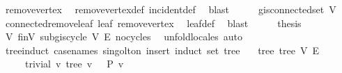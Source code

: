 \begin{isabellebody}
\ remove{\isacharunderscore}{\kern0pt}vertex\ \isamarkupfalse%
\ remove{\isacharunderscore}{\kern0pt}vertex{\isacharunderscore}{\kern0pt}def\ incident{\isacharunderscore}{\kern0pt}def\ \isamarkupfalse%
\ blast\isanewline
\ \ \isamarkupfalse%
\ \isamarkupfalse%
\ {\isachardoublequoteopen}g{\isacharprime}{\kern0pt}{\isachardot}{\kern0pt}is{\isacharunderscore}{\kern0pt}connected{\isacharunderscore}{\kern0pt}set\ V{\isacharprime}{\kern0pt}{\isachardoublequoteclose}\ \isamarkupfalse%
\ connected{\isacharunderscore}{\kern0pt}remove{\isacharunderscore}{\kern0pt}leaf\ leaf\ remove{\isacharunderscore}{\kern0pt}vertex\ \isamarkupfalse%
\ leaf{\isacharunderscore}{\kern0pt}def\ \isamarkupfalse%
\ blast\isanewline
\ \ \isamarkupfalse%
\ \isamarkupfalse%
\ {\isacharquery}{\kern0pt}thesis\ \isamarkupfalse%
\ {\isacartoucheopen}V{\isacharprime}{\kern0pt}{\isasymnoteq}{\isacharbraceleft}{\kern0pt}{\isacharbraceright}{\kern0pt}{\isacartoucheclose}\ finV\ subg{\isachardot}{\kern0pt}is{\isacharunderscore}{\kern0pt}cycle{}\ V{\isacharprime}{\kern0pt}\ E{\isacharprime}{\kern0pt}\ no{\isacharunderscore}{\kern0pt}cycles\ \isamarkupfalse%
\ {\isacharparenleft}{\kern0pt}unfold{\isacharunderscore}{\kern0pt}locales{\isacharcomma}{\kern0pt}\ auto{\isacharparenright}{\kern0pt}\isanewline
{}\isamarkupfalse%
%
\endisatagproof
{\isafoldproof}%
%
\isadelimproof
\isanewline
%
\endisadelimproof
\isanewline
{}\isamarkupfalse%
\isanewline
\isanewline
{}\isamarkupfalse%
\ tree{\isacharunderscore}{\kern0pt}induct\ {\isacharbrackleft}{\kern0pt}case{\isacharunderscore}{\kern0pt}names\ singolton\ insert{\isacharcomma}{\kern0pt}\ induct\ set{\isacharcolon}{\kern0pt}\ tree{\isacharbrackright}{\kern0pt}{\isacharcolon}{\kern0pt}\isanewline
\ \ \ tree{\isacharcolon}{\kern0pt}\ {\isachardoublequoteopen}tree\ V\ E{\isachardoublequoteclose}\isanewline
\ \ \ \ \ trivial{\isacharcolon}{\kern0pt}\ {\isachardoublequoteopen}{\isasymAnd}v{\isachardot}{\kern0pt}\ tree\ {\isacharbraceleft}{\kern0pt}v{\isacharbraceright}{\kern0pt}\ {\isacharbraceleft}{\kern0pt}{\isacharbraceright}{\kern0pt}\ {\isasymLongrightarrow}\ P\ {\isacharbraceleft}{\kern0pt}v{\isacharbraceright}{\kern0pt}\ {\isacharbraceleft}{\kern0pt}{\isacharbraceright}{\kern0pt}{\isachardoublequoteclose}\isanewline

\end{isabellebody}
